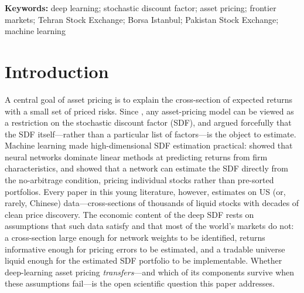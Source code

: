\documentclass[12pt]{article}
\begin{document}
\begin{abstract}
risk-free asset) the deep SDF portfolio attains Sharpes of @@SIGN_RANGE@@ in every market---stable across training seeds and competitive with the strongest factor benchmarks in each (above them in Iran and Pakistan, essentially tied with the Turkish q-factor); we report this as a diagnostic upper bound, not an implementable result. An \emph{ex-ante} sign-pinning penalty estimated from training data alone then separates weak optimization identification from genuine train-to-test instability: it improves orientation in Iran, is neutral in T\"urkiye, and fails in Pakistan---so small-market portfolio instability ranges from weak sign identification (Iran) through already-persistent orientation (T\"urkiye) to genuine train-to-test portfolio instability (Pakistan). The binding frontier-market constraint is therefore not liquidity but estimator identification: portfolio-level conclusions from small cross-sections require sign pinning or equivalent regularization before they can be read economically.
\end{abstract}

\vspace{1em}
\noindent\textbf{Keywords:} deep learning; stochastic discount factor; asset pricing; frontier markets; Tehran Stock Exchange; Borsa Istanbul; Pakistan Stock Exchange; machine learning

\section{Introduction}\label{sec:intro}

A central goal of asset pricing is to explain the cross-section of expected returns with a small set of priced risks. Since \citet{hj1991}, any asset-pricing model can be viewed as a restriction on the stochastic discount factor (SDF), and \citet{cochrane2011} argued forcefully that the SDF itself---rather than a particular list of factors---is the object to estimate. Machine learning made high-dimensional SDF estimation practical: \citet{gkx2020} showed that neural networks dominate linear methods at predicting returns from firm characteristics, and \citet{cpz2024} showed that a network can estimate the SDF directly from the no-arbitrage condition, pricing individual stocks rather than pre-sorted portfolios. Every paper in this young literature, however, estimates on US (or, rarely, Chinese) data---cross-sections of thousands of liquid stocks with decades of clean price discovery. The economic content of the deep SDF rests on assumptions that such data satisfy and that most of the world's markets do not: a cross-section large enough for network weights to be identified, returns informative enough for pricing errors to be estimated, and a tradable universe liquid enough for the estimated SDF portfolio to be implementable. Whether deep-learning asset pricing \emph{transfers}---and which of its components survive when these assumptions fail---is the open scientific question this paper addresses.
\end{document}
